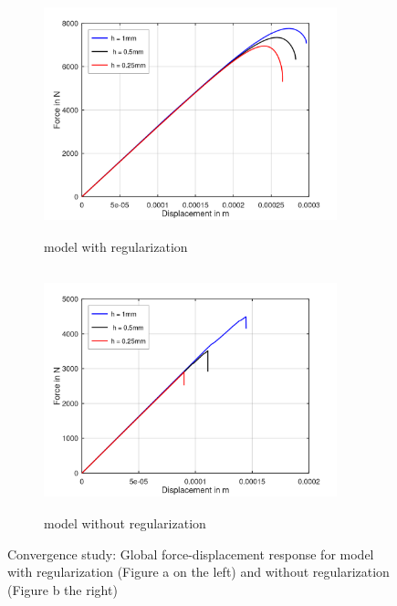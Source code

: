 \documentclass[12pt,a4paper,twoside,openright]{report}
\begin{document}
\begin{figure}[htbp!]
       \begin{subfigure}{0.45\textwidth}
         \includegraphics[width=8.5cm,height=7cm]{25.FvsD.png}
         \caption{model with regularization}
         \label{fig:with regularization}
     \end{subfigure}
     \hspace{1.3cm}
     \begin{subfigure}{0.45\textwidth}
         \includegraphics[width=8.5cm,height=7cm]{25.FvsD2.png}
         \caption{model without regularization}
         \label{fig:without regularization}
     \end{subfigure}
    \caption{Convergence study: Global force-displacement response for model with regularization (Figure a on the left) and without regularization (Figure b the right) }
    \label{fig:Convergence study}
\end{figure}
\FloatBarrier
 
\end{document}
